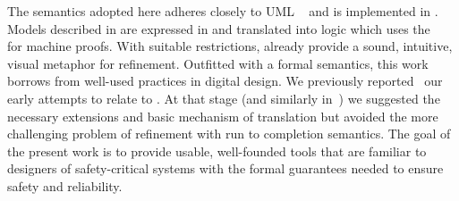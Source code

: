 The semantics adopted here adheres closely to UML \Statecharts~\cite{Alexandre} and is implemented in \iUMLB.
Models described in \Statecharts are expressed in \SCXML and translated into \EventB logic which uses the \Rodin~\cite{abrial10:_rodin} for machine proofs.
With suitable restrictions, \Statecharts already provide a sound, intuitive, visual metaphor for refinement. 
Outfitted with a formal semantics, this work borrows from well-used \Statechart practices in digital design.  
We previously reported~\cite{Morris_2016} our early attempts to relate \Statecharts to \EventB. 
At that stage (and similarly in\mbox{~\cite{Snook12:FMCO}}) we suggested the necessary extensions and basic mechanism of translation but avoided the more challenging problem of refinement with run to completion semantics. 
The goal of the present work is to provide usable, well-founded tools that are familiar to designers of safety-critical systems with the formal guarantees needed to ensure safety and reliability.

%



